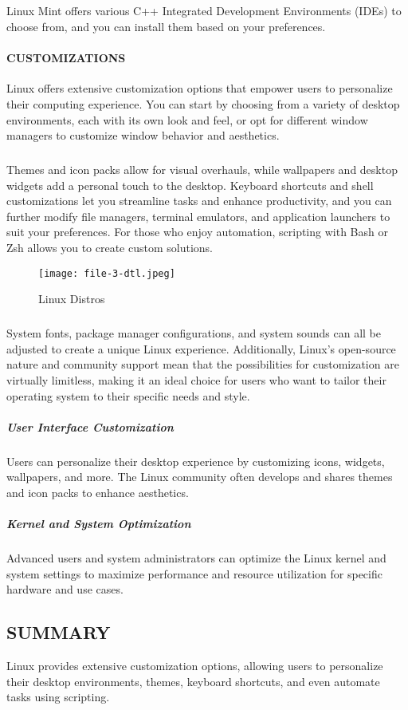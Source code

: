 \documentclass{article}
\begin{document}
\subparagraph{}
Linux Mint offers various C++ Integrated Development Environments (IDEs) to choose from, and you can install them based on your preferences. 

\paragraph{CUSTOMIZATIONS}
Linux offers extensive customization options that empower users to personalize their computing experience. You can start by choosing from a variety of desktop environments, each with its own look and feel, or opt for different window managers to customize window behavior and aesthetics. 
\subparagraph{}
Themes and icon packs allow for visual overhauls, while wallpapers and desktop widgets add a personal touch to the desktop. Keyboard shortcuts and shell customizations let you streamline tasks and enhance productivity, and you can further modify file managers, terminal emulators, and application launchers to suit your preferences. For those who enjoy automation, scripting with Bash or Zsh allows you to create custom solutions. 


\begin{figure}
\texttt{[image: file-3-dtl.jpeg]}
\caption{Linux Distros}
\label{fig:Linux Distros}
\end{figure}



\subparagraph{}
System fonts, package manager configurations, and system sounds can all be adjusted to create a unique Linux experience. Additionally, Linux's open-source nature and community support mean that the possibilities for customization are virtually limitless, making it an ideal choice for users who want to tailor their operating system to their specific needs and style.


\subparagraph{User Interface Customization}
Users can personalize their desktop experience by customizing icons, widgets, wallpapers, and more. The Linux community often develops and shares themes and icon packs to enhance aesthetics.

\subparagraph{Kernel and System Optimization}
Advanced users and system administrators can optimize the Linux kernel and system settings to maximize performance and resource utilization for specific hardware and use cases.


\subsection{SUMMARY}
Linux provides extensive customization options, allowing users to personalize their desktop environments, themes, keyboard shortcuts, and even automate tasks using scripting.
\end{document}
